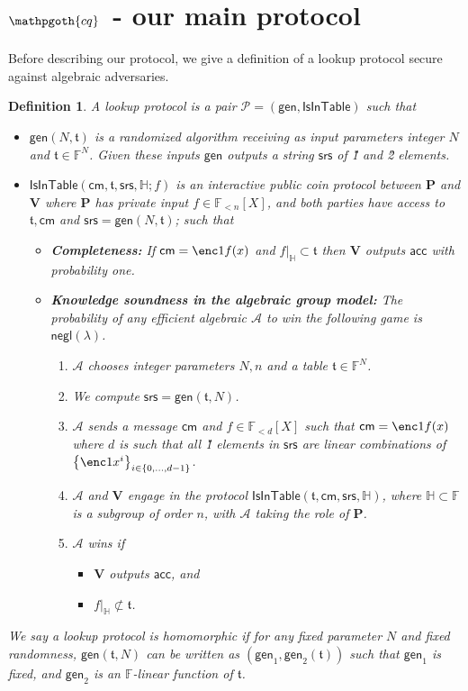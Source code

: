 \documentclass[11pt]{article} %
\newcommand{\cq}{\ensuremath{\mathpgoth{cq} }\xspace}
\newcommand{\F}{\ensuremath{\mathbb F}\xspace}
\newcommand{\adv}{\ensuremath{\mathcal A}\xspace}
\newcommand{\srs}{\ensuremath{\mathsf{srs}}\xspace}
\newcommand{\cm}{\ensuremath{\mathsf{cm}}\xspace}
\newcommand{\negl}{\ensuremath{\mathsf{negl}(\lambda)}\xspace}
\newcommand{\acc}{\ensuremath{\mathsf{acc}}\xspace}
\newcommand{\sett}[2]{\ensuremath{\set{#1}_{#2}}\xspace}
\newcommand{\gen}{\ensuremath{\mathsf{gen}}\xspace}
\newcommand{\prv}{\ensuremath{\mathsf{\mathbf{P}}}\xspace}
\newcommand{\ver}{\ensuremath{\mathsf{\mathbf{V}}}\xspace}
\newcommand{\set}[1]{\ensuremath{\left\{#1\right\}}\xspace}
\newcommand{\polysofdeg}[1]{\ensuremath{\F_{< #1}[X]}\xspace}
\newcommand{\prot}{\ensuremath{\mathscr{P}}\xspace}
\newtheorem{dfn}[lemma]{Definition}
\newcommand{\restricttoset}[2]{\ensuremath{#1|_{#2}}\xspace}
\newcommand{\isintable}{\ensuremath{\mathsf{IsInTable}}\xspace}
\newcommand{\subspace}{\ensuremath{\mathbb{H}}\xspace}
\newcommand{\witsize}{\ensuremath{n}\xspace}
\newcommand{\tabsize}{\ensuremath{N}\xspace}
\newcommand{\tab}{\ensuremath{\mathfrak{t}}\xspace}
\begin{document}
\section{$\cq\;$ - our main protocol}
Before describing our protocol, we give a definition of a lookup protocol secure against algebraic adversaries.
\begin{dfn}\label{dfn:lookupprot}
A \emph{lookup protocol} is a pair $\prot=(\gen,\isintable)$ such that
\begin{itemize}
 \item $\gen(\tabsize,\tab)$ is a randomized algorithm receiving as input parameters integer $\tabsize$ and $\tab\in \F^\tabsize$. 
 Given these inputs \gen outputs a string \srs of \G1 and \G2 elements.
 \item $\isintable(\cm,\tab,\srs,\subspace;f)$ is an interactive public coin protocol between \prv and \ver where \prv has private input $f\in \polysofdeg{\witsize}$, and both parties have access to $\tab,\cm$ and  $\srs=\gen(\tabsize,\tab)$;
 such that
 \begin{itemize}
  \item \textbf{Completeness:} If $\cm=\enc1{f(x)}$ and $\restricttoset{f}{\subspace}\subset \tab$ then \ver outputs \acc with probability one.
  \item \textbf{Knowledge soundness in the algebraic group model:}
    The probability of any efficient algebraic \adv to win the following game is \negl.

\begin{enumerate}
\item \adv chooses integer parameters $\tabsize,\witsize$ and a table $\tab\in \F^\tabsize$.
 \item We compute $\srs=\gen(\tab,\tabsize)$.
 \item \adv sends a message \cm and $f\in\polysofdeg{d}$ such that $\cm=\enc1{f(x)}$ where $d$ is such that all \G1 elements in \srs are linear
 combinations of \sett{\enc1{x^i}}{i\in \set{0,\ldots,d-1}}.
 \item \adv and \ver engage in the protocol $\isintable(\tab,\cm,\srs,\subspace)$, where $\subspace\subset \F$ is a subgroup of order \witsize, with \adv taking the role of \prv.
 \item \adv wins if 
 \begin{itemize}
  \item \ver outputs \acc, and
  \item $\restricttoset{f}{\subspace}\not\subset \tab$.
 \end{itemize}

\end{enumerate}
\end{itemize}
\end{itemize}
We say a lookup protocol is \emph{homomorphic} if for any fixed parameter \tabsize and fixed randomness, $\gen(\tab,\tabsize)$ can be written as $(\gen_1,\gen_2(\tab))$ such that $\gen_1$ is fixed, and $\gen_2$ is an $\F$-linear function of \tab.
\end{dfn}
\end{document}
